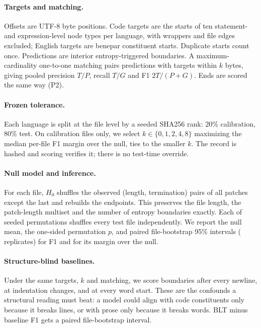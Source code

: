 \paragraph{Targets and matching.} Offsets are UTF-8 byte positions. Code targets are the starts of ten statement- and expression-level node types per language, with wrappers and file edges excluded; English targets are benepar constituent starts. Duplicate starts count once. Predictions are interior entropy-triggered boundaries. A maximum-cardinality one-to-one matching pairs predictions with targets within $k$ bytes, giving pooled precision $T/P$, recall $T/G$ and F1 $2T/(P+G)$. Ends are scored the same way (P2).

\paragraph{Frozen tolerance.} Each language is split at the file level by a seeded SHA256 rank: 20\% calibration, 80\% test. On calibration files only, we select $k\in\{0,1,2,4,8\}$ maximizing the median per-file F1 margin over the null, ties to the smaller $k$. The record is hashed and scoring verifies it; there is no test-time override.

\paragraph{Null model and inference.} For each file, $H_0$ shuffles the observed (length, termination) pairs of all patches except the last and rebuilds the endpoints. This preserves the file length, the patch-length multiset and the number of entropy boundaries exactly. Each of \nPerm{} seeded permutations shuffles every test file independently. We report the null mean, the one-sided permutation $p$, and paired file-bootstrap 95\% intervals (\nBoot{} replicates) for F1 and for its margin over the null.

\paragraph{Structure-blind baselines.} Under the same targets, $k$ and matching, we score boundaries after every newline, at indentation changes, and at every word start. These are the confounds a structural reading must beat: a model could align with code constituents only because it breaks lines, or with prose only because it breaks words. BLT minus baseline F1 gets a paired file-bootstrap interval.

